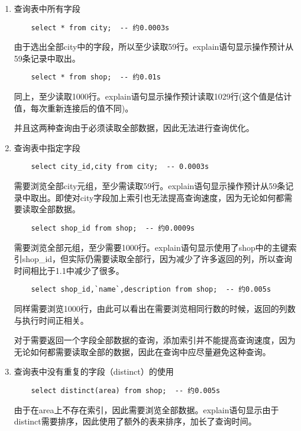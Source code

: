 \documentclass[a4paper, 11pt, nofonts, nocap, fancyhdr]{ctexart}
\begin{document}
\begin{enumerate}
	\item 查询表中所有字段

	\begin{lstlisting}
	select * from city;  -- 约0.0003s
	\end{lstlisting}
由于选出全部city中的字段，所以至少读取59行。explain语句显示操作预计从59条记录中取出。

	\begin{lstlisting}
	select * from shop;  -- 约0.01s
	\end{lstlisting}
同上，至少读取1000行。explain语句显示操作预计读取1029行(这个值是估计值，每次重新连接后的值不同)。

	并且这两种查询由于必须读取全部数据，因此无法进行查询优化。\\
	
	\item 查询表中指定字段
	
	\begin{lstlisting}
	select city_id,city from city;  -- 0.0003s
	\end{lstlisting}
需要浏览全部city元组，至少需读取59行。explain语句显示操作预计从59条记录中取出。即使对city字段加上索引也无法提高查询速度，因为无论如何都需要读取全部数据。
	
	\begin{lstlisting}
	select shop_id from shop;  -- 约0.0009s
	\end{lstlisting}
需要浏览全部元组，至少需要1000行。explain语句显示使用了shop中的主键索引shop_id，但实际仍需要读取全部行，因为减少了许多返回的列，所以查询时间相比于1.1中减少了很多。

	\begin{lstlisting}
	select shop_id,`name`,description from shop;  -- 约0.005s
	\end{lstlisting}
同样需要浏览1000行，由此可以看出在需要浏览相同行数的时候，返回的列数与执行时间正相关。

对于需要返回一个字段全部数据的查询，添加索引并不能提高查询速度，因为无论如何都需要读取全部的数据，因此在查询中应尽量避免这种查询。\\

	\item 查询表中没有重复的字段（distinct）的使用

	\begin{lstlisting}
	select distinct(area) from shop;  -- 约0.005s
	\end{lstlisting}
由于在area上不存在索引，因此需要浏览全部数据。explain语句显示由于distinct需要排序，因此使用了额外的表来排序，加长了查询时间。


\end{enumerate}
\end{document}
